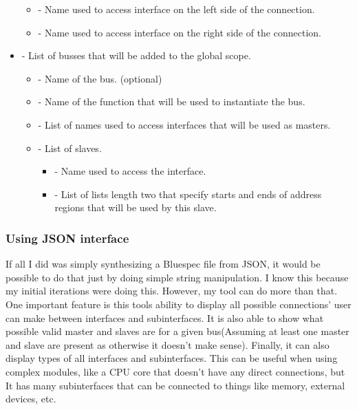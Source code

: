 \documentclass[14pt]{report}
\begin{document}
\begin{itemize}
    \begin{itemize}
        \item {} - Name used to access interface on the left side of the connection.
        \item {} - Name used to access interface on the right side of the connection.
    \end{itemize}
    \item  {} - List of busses that will be added to the global scope. \\
    \begin{itemize}
        \item {} - Name of the bus. (optional)
        \item {} - Name of the function that will be used to instantiate the bus.
        \item {} - List of names used to access interfaces that will be used as masters.
        \item {} - List of slaves. 
        \begin{itemize}
            \item {} - Name used to access the interface.
            \item {} - List of lists length two that specify starts and ends of address regions that will be used by this slave. 
        \end{itemize}
    \end{itemize}
\end{itemize}

\subsubsection{Using JSON interface} 
If all I did was simply synthesizing a Bluespec file from JSON, it would be possible to do that just by doing simple string manipulation.
I know this because my initial iterations were doing this. However, my tool can do more than that. One important feature is this tools ability to display all possible connections' user can make between interfaces and subinterfaces. It is also able to show what possible valid master and slaves are for a given bus(Assuming at least one master and slave are present as otherwise it doesn't make sense). Finally, it can also display types of all interfaces and subinterfaces. This can be useful when using complex modules, like a CPU core that doesn't have any direct connections, but It has many subinterfaces that can be connected to things like memory, external devices, etc.
\end{document}
